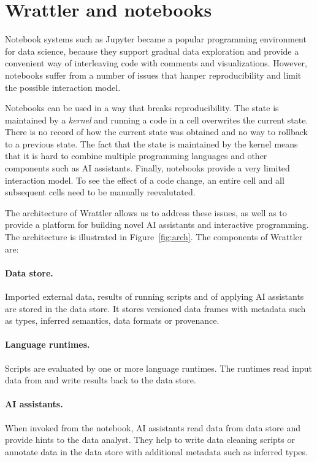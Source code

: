 \documentclass[sigplan,preprint,10pt]{acmart}\settopmatter{printfolios=true,printccs=false,printacmref=false}
\theoremstyle{plain}
\theoremstyle{definition}
\begin{document}
\section{Wrattler and notebooks}

Notebook systems such as Jupyter became a popular programming environment for data science, because 
they support gradual data exploration and provide a convenient way of interleaving code with 
comments and visualizations. However, notebooks suffer from a number of issues that hanper 
reproducibility and limit the possible interaction model.

Notebooks can be used in a way that breaks reproducibility. The state is maintained by a \emph{kernel} 
and running a code in a cell overwrites the current state. There is no record of how the current 
state was obtained and no way to rollback to a previous state. The fact that the state is 
maintained by the kernel means that it is hard to combine multiple programming languages and
other components such as AI assistants. Finally, notebooks provide a very limited interaction 
model. To see the effect of a code change, an entire cell and all subsequent cells need to be
manually reevalutated.

The architecture of Wrattler allows us to address these issues, as well as to provide a platform
for building novel AI assistants and interactive programming. The architecture is illustrated
in Figure~\ref{fig:arch}. The components of Wrattler are:
%
\paragraph{Data store.} Imported external data, results of running scripts and of 
applying AI assistants are stored in the data store. It stores versioned data frames with 
metadata such as types, inferred semantics, data formats or provenance.

\paragraph{Language runtimes.} Scripts are evaluated by one or more language runtimes.
The runtimes read input data from and write results back to the data store.

\paragraph{AI assistants.} When invoked from the notebook, AI assistants read data
from data store and provide hints to the data analyst. They help to write data cleaning
scripts or annotate data in the data store with additional metadata such as inferred types.
\end{document}
